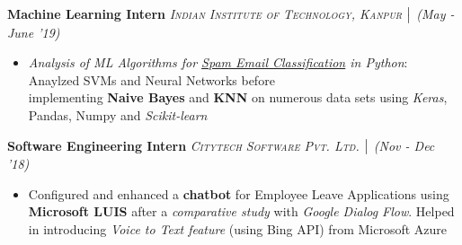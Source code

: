 \documentclass{article}
\begin{document}
\textbf{Machine Learning Intern} \hfill{\sl \small \textsc{Indian Institute of Technology, Kanpur} $\bigm|$ (May - June '19)}\\
\vspace{-19pt}
\begin{itemize}[itemsep = -1 mm, leftmargin=*]
    \item \textit{Analysis of ML Algorithms for \underline{Spam Email Classification} in Python}: Anaylzed SVMs and Neural Networks before\\implementing {\bf Naive Bayes} and {\bf KNN} on numerous data sets using {\it Keras}, Pandas, Numpy and {\it Scikit-learn}
\end{itemize}
\vspace{-5pt}
\textbf{Software Engineering Intern} \hfill{\sl \small \textsc{Citytech Software Pvt. Ltd.} $\bigm|$ (Nov - Dec '18)}\\
\vspace{-19pt}
\begin{itemize}[itemsep = -1 mm, leftmargin=*]
  \item Configured and enhanced a {\bf chatbot} for Employee Leave Applications using {\bf Microsoft LUIS} after a {\sl comparative study} with {\it Google Dialog Flow}. Helped in introducing \textsl{Voice to Text feature} (using Bing API) from Microsoft Azure
\end{itemize}


\vspace{-20pt}
\end{document}
